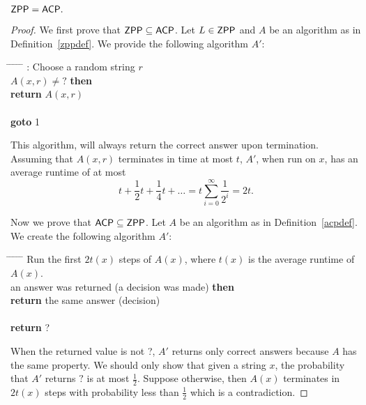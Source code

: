 \begin{proposition}
$\mathsf{ZPP} = \mathsf{ACP}.$
\end{proposition}
\begin{proof}
We first prove that $\mathsf{ZPP} \subseteq \mathsf{ACP}$. Let $L \in \mathsf{ZPP}$ and $A$ be an algorithm as in Definition~\ref{zppdef}. We provide the following algorithm $A'$:
\begin{tabbing}
\hspace*{.25in} \= \hspace*{.25in} \= \hspace*{.25in} \= \hspace*{.25in} \= \hspace*{.25in} \=\kill
{}: Choose a random string $r$\\
 $A(x, r) \not = ?$ {\bf then } \\
\>\> {\bf return} $A(x, r)$ \\
 \\
\>\> {\bf goto} 1\\
\end{tabbing}

This algorithm, will always return the correct answer upon termination. Assuming that $A(x, r)$ terminates in time at most $t$, $A'$, when run on $x$, has an average runtime of at most $$t + \frac{1}{2} t + \frac{1}{4} t + \ldots = t \sum_{i=0}^\infty \frac{1}{2^i} = 2t.$$

Now we prove that $\mathsf{ACP} \subseteq \mathsf{ZPP}$. Let $A$ be an algorithm as in Definition~\ref{acpdef}. We create the following algorithm $A'$:

\begin{tabbing}
\hspace*{.25in} \= \hspace*{.25in} \= \hspace*{.25in} \= \hspace*{.25in} \= \hspace*{.25in} \=\kill
\> Run the first $2 t(x)$ steps of $A(x)$, where $t(x)$ is the average runtime of $A(x)$. \\
 an answer was returned (a decision was made) {\bf then } \\
\>\> {\bf return} the same answer (decision) \\
 \\
\>\> {\bf return} ?\\
\end{tabbing}

When the returned value is not ?, $A'$ returns only correct answers because $A$ has the same property. We should only show that given a string $x$, the probability that $A'$ returns $?$ is at most $\frac{1}{2}$. Suppose otherwise, then $A(x)$ terminates in $2 t(x)$ steps with probability less than $\frac{1}{2}$ which is a contradiction.
\end{proof}




